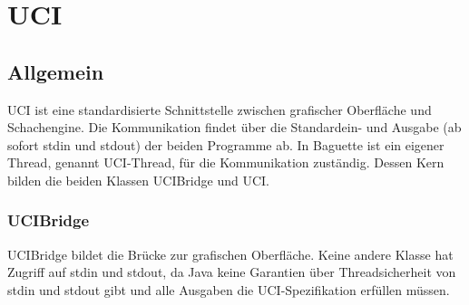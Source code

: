 \section{UCI}
\subsection{Allgemein}
UCI ist eine standardisierte Schnittstelle zwischen grafischer Oberfläche und Schachengine.
Die Kommunikation findet über die Standardein- und Ausgabe (ab sofort stdin und stdout) der beiden Programme ab.
\newline
In Baguette ist ein eigener Thread, genannt UCI-Thread, für die Kommunikation zuständig.
Dessen Kern bilden die beiden Klassen UCIBridge und UCI.
\subsubsection{UCIBridge}
UCIBridge bildet die Brücke zur grafischen Oberfläche. Keine andere Klasse hat Zugriff auf stdin und stdout, da Java keine Garantien über Threadsicherheit von stdin und stdout gibt und alle Ausgaben die UCI-Spezifikation erfüllen müssen.
\pagebreak